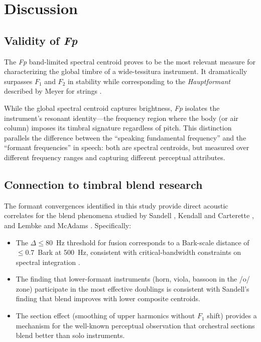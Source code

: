 \documentclass[12pt,a4paper]{article}
\begin{document}
\section{Discussion}

\subsection{Validity of \textit{Fp}}

The \textit{Fp} band-limited spectral centroid proves to be the most relevant
measure for characterizing the global timbre of a wide-tessitura instrument. It
dramatically surpasses $F_1$ and $F_2$ in stability while corresponding to the
\emph{Hauptformant} described by Meyer for strings \citep{Meyer2009}.

While the global spectral centroid \citep{Peeters2011} captures brightness,
\textit{Fp} isolates the instrument's resonant identity---the frequency region
where the body (or air column) imposes its timbral signature regardless of pitch.
This distinction parallels the difference between the ``speaking fundamental
frequency'' and the ``formant frequencies'' in speech: both are spectral centroids,
but measured over different frequency ranges and capturing different perceptual
attributes.

\subsection{Connection to timbral blend research}

The formant convergences identified in this study provide direct acoustic
correlates for the blend phenomena studied by Sandell \citep{Sandell1995},
Kendall and Carterette \citep{Kendall1993}, and Lembke and McAdams
\citep{Lembke2017}. Specifically:

\begin{itemize}
\item The $\Delta \leq 80$~Hz threshold for fusion corresponds to a Bark-scale
distance of $\leq 0.7$~Bark at 500~Hz, consistent with critical-bandwidth
constraints on spectral integration \citep{Zwicker1961}.

\item The finding that lower-formant instruments (horn, viola, bassoon in the
/o/ zone) participate in the most effective doublings is consistent with
Sandell's finding that blend improves with lower composite centroids.

\item The section effect (smoothing of upper harmonics without $F_1$ shift)
provides a mechanism for the well-known perceptual observation that
orchestral sections blend better than solo instruments.
\end{itemize}
\end{document}
